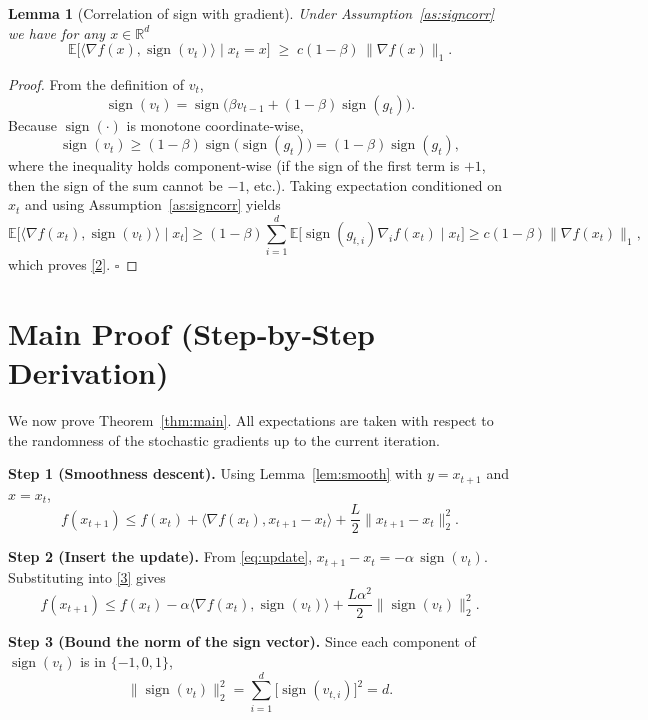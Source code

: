 \documentclass{article}
\newtheorem{lemma}{Lemma}[section]
\begin{document}
\begin{lemma}[Correlation of sign with gradient]\label{lem:signcorr}
Under Assumption~\ref{as:signcorr} we have for any $x\in\mathbb{R}^{d}$
\[
\mathbb{E}\bigl[\langle\nabla f(x),\operatorname{sign}(v_{t})\rangle\mid x_{t}=x\bigr]
\;\ge\;c(1-\beta)\,\|\nabla f(x)\|_{1}.
\tag{2}
\]
\end{lemma}
\begin{proof}
From the definition of $v_{t}$,
\[
\operatorname{sign}(v_{t})
 =\operatorname{sign}\bigl(\beta v_{t-1}+(1-\beta)\operatorname{sign}(g_{t})\bigr).
\]
Because $\operatorname{sign}(\cdot)$ is monotone coordinate‑wise,
\[
\operatorname{sign}(v_{t})\ge (1-\beta)\operatorname{sign}\bigl(\operatorname{sign}(g_{t})\bigr)=(1-\beta)\operatorname{sign}(g_{t}),
\]
where the inequality holds component‑wise (if the sign of the first term is $+1$, then the sign of the sum cannot be $-1$, etc.). Taking expectation conditioned on $x_{t}$ and using Assumption~\ref{as:signcorr} yields
\[
\mathbb{E}\bigl[\langle\nabla f(x_{t}),\operatorname{sign}(v_{t})\rangle\mid x_{t}\bigr]
\ge (1-\beta)\sum_{i=1}^{d}
\mathbb{E}\bigl[\operatorname{sign}(g_{t,i})\nabla_{i}f(x_{t})\mid x_{t}\bigr]
\ge c(1-\beta)\|\nabla f(x_{t})\|_{1},
\]
which proves \eqref{2}. \hfill $\square$
\end{proof}

\section*{Main Proof (Step‑by‑Step Derivation)}
We now prove Theorem~\ref{thm:main}. All expectations are taken with respect to the randomness of the stochastic gradients up to the current iteration.

\medskip
\noindent\textbf{Step 1 (Smoothness descent).}  
Using Lemma~\ref{lem:smooth} with $y=x_{t+1}$ and $x=x_{t}$,
\[
f(x_{t+1})
\le f(x_{t})+\langle\nabla f(x_{t}),x_{t+1}-x_{t}\rangle+\frac{L}{2}\|x_{t+1}-x_{t}\|_{2}^{2}.
\tag{3}
\]

\noindent\textbf{Step 2 (Insert the update).}  
From \eqref{eq:update}, $x_{t+1}-x_{t}=-\alpha\,\operatorname{sign}(v_{t})$. Substituting into \eqref{3} gives
\[
f(x_{t+1})
\le f(x_{t})-\alpha\langle\nabla f(x_{t}),\operatorname{sign}(v_{t})\rangle
+\frac{L\alpha^{2}}{2}\|\operatorname{sign}(v_{t})\|_{2}^{2}.
\tag{4}
\]

\noindent\textbf{Step 3 (Bound the norm of the sign vector).}  
Since each component of $\operatorname{sign}(v_{t})$ is in $\{-1,0,1\}$,
\[
\|\operatorname{sign}(v_{t})\|_{2}^{2}= \sum_{i=1}^{d}\bigl[\operatorname{sign}(v_{t,i})\bigr]^{2}=d .
\tag{5}
\]
\end{document}
